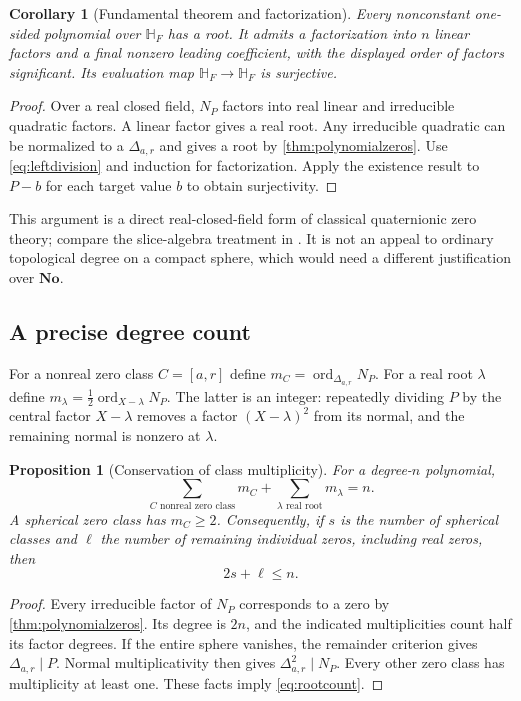 \documentclass[11pt,letterpaper]{article}
\numberwithin{equation}{section}
\newtheorem{proposition}[proposition]{Proposition}
\newtheorem{corollary}[corollary]{Corollary}
\theoremstyle{definition}
\theoremstyle{remark}
\newcommand{\No}{\mathbf{No}}
\newcommand{\HF}{\mathbb H_F}
\newcommand{\ord}{\operatorname{ord}}
\begin{document}
\begin{corollary}[Fundamental theorem and factorization]\label{cor:fta}
Every nonconstant one-sided polynomial over $\HF$ has a root. It admits a factorization
into $n$ linear factors and a final nonzero leading coefficient, with the displayed order of
factors significant. Its evaluation map $\HF\to\HF$ is surjective.
\end{corollary}
\begin{proof}
Over a real closed field, $N_P$ factors into real linear and irreducible quadratic factors.
A linear factor gives a real root. Any irreducible quadratic can be normalized to a
$\Delta_{a,r}$ and gives a root by \cref{thm:polynomialzeros}.
Use \eqref{eq:leftdivision} and induction for factorization. Apply the existence result to
$P-b$ for each target value $b$ to obtain surjectivity.
\end{proof}

This argument is a direct real-closed-field form of classical quaternionic zero theory;
compare the slice-algebra treatment in \cite{GP}. It is not an appeal to ordinary topological
degree on a compact sphere, which would need a different justification over $\No$.

\subsection{A precise degree count}
For a nonreal zero class $C=[a,r]$ define
$m_C=\ord_{\Delta_{a,r}}N_P$. For a real root $\lambda$ define
$m_\lambda=\tfrac12\ord_{X-\lambda}N_P$. The latter is an integer: repeatedly dividing
$P$ by the central factor $X-\lambda$ removes a factor $(X-\lambda)^2$ from its normal,
and the remaining normal is nonzero at $\lambda$.

\begin{proposition}[Conservation of class multiplicity]\label{prop:rootcount}
For a degree-$n$ polynomial,
\[
 \sum_{C\text{ nonreal zero class}}m_C+
 \sum_{\lambda\text{ real root}}m_\lambda=n.
\]
A spherical zero class has $m_C\ge2$. Consequently, if $s$ is the number of spherical
classes and $\ell$ the number of remaining individual zeros, including real zeros, then
\begin{equation}\label{eq:rootcount}
 2s+\ell\le n.
\end{equation}
\end{proposition}
\begin{proof}
Every irreducible factor of $N_P$ corresponds to a zero by \cref{thm:polynomialzeros}.
Its degree is $2n$, and the indicated multiplicities count half its factor degrees.
If the entire sphere vanishes, the remainder criterion gives $\Delta_{a,r}\mid P$.
Normal multiplicativity then gives $\Delta_{a,r}^2\mid N_P$. Every other zero class has
multiplicity at least one. These facts imply \eqref{eq:rootcount}.
\end{proof}
\end{document}
